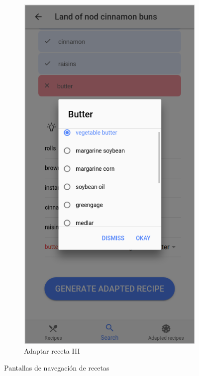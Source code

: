 \begin{figure}[H]
\begin{subfigure}[b]{0.3235
    \linewidth}
        \label{fig:ejemplo2_}
    \end{subfigure}
        \begin{subfigure}[b]{0.32\linewidth}
        \includegraphics[width=\linewidth]{imagenes/app/pantallas/ejemplo3.png}
        \caption{Adaptar receta III}
        \label{fig:ejemplo3_}
    \end{subfigure}
    \caption{Pantallas de navegación de recetas}
    \label{fig:pantallas_inicio4}
\end{figure}

